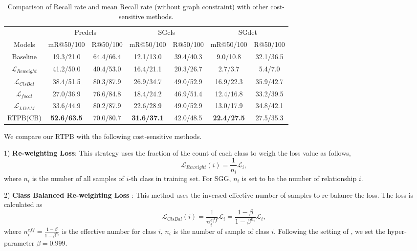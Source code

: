 \begin{table}[!ht]
	\centering
	\begin{tabular}{c|cc|cc|cc}
		\hline
		& \multicolumn{2}{c|}{Predcls} & \multicolumn{2}{c|}{SGcls} & \multicolumn{2}{c}{SGdet} \\
		Models                   & mR@50/100     & R@50/100     & mR@50/100    & R@50/100    & mR@50/100    & R@50/100    \\ \hline
		Baseline                 & 19.3/21.0     & 64.4/66.4    & 12.1/13.0    & 39.4/40.3   & 9.0/10.8     & 32.1/36.5   \\
		$\mathcal{L}_{Reweight}$ & 41.2/50.0     & 40.4/53.0    & 16.4/21.1    & 20.3/26.7   & 2.7/3.7      & 5.4/7.0     \\
		$\mathcal{L}_{ClsBal}$   & 38.4/51.5     & 80.3/87.9    & 26.9/34.7    & 49.0/52.9   & 16.9/22.3    & 35.9/42.7   \\
		$\mathcal{L}_{focal}$    & 27.0/36.9     & 76.6/84.8    & 18.4/24.2    & 46.9/51.4   & 12.4/16.8    & 33.2/39.5   \\
		$\mathcal{L}_{LDAM}$     & 33.6/44.9     & 80.2/87.9    & 22.6/28.9    & 49.0/52.9   & 13.0/17.9    & 34.8/42.1   \\
		RTPB(CB)                 & \textbf{52.6/63.5}     & 70.0/80.7    & \textbf{31.6/37.1}    & 42.0/48.5   & \textbf{22.4/27.5}    & 27.5/35.3   \\ \hline
	\end{tabular}
	\caption{Comparison of Recall rate and mean Recall rate (without graph constraint) with other cost-sensitive methods.}
	\label{tab:debias_ng}
\end{table}
We compare our RTPB with the following cost-sensitive methods. 

1) \textbf{Re-weighting Loss}: This strategy uses the fraction of the count of each class to weigh the loss value as follows,
\begin{equation}
	\mathcal{L}_{Reweight}(i) = \frac{1}{n_i}\mathcal{L}_i, 
\end{equation}
where $n_i$ is the number of all samples of $i$-th class in training set. For SGG, $n_i$ is set to be the number of relationship $i$.


2) \textbf{Class Balanced Re-weighting Loss} \cite{cui2019class}: This method uses the inversed effective number of samples to re-balance the loss. The loss is calculated as
\begin{equation}
	\mathcal{L}_{ClsBal}(i) = \frac{1}{n_i^{eff}}\mathcal{L}_i = \frac{1-\beta}{1-\beta^{n_i}}\mathcal{L}_i,
\end{equation}
where $n_i^{eff} = \frac{1-\beta}{1-\beta^{n_i}}$ is the effective number for class $i$, $n_i$ is the number of sample of class $i$. Following the setting of  \cite{cui2019class}, we set the hyper-parameter $\beta= 0.999$. 

